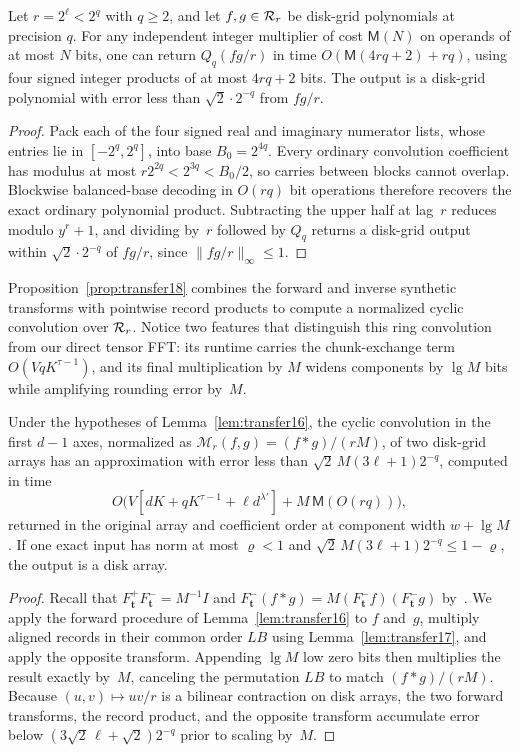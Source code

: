 \begin{lemma}\label{lem:transfer17}
Let $r=2^\ell<2^q$ with $q\ge2$, and let $f,g\in\mathcal{R}_r$ be disk-grid polynomials at precision $q$. For any independent
integer multiplier of cost $\mathsf M(N)$ on operands of at most $N$ bits, one can return $Q_q(fg/r)$ in time
$O(\mathsf M(4rq+2)+rq)$, using four signed integer products of at most $4rq+2$ bits. The output is a disk-grid
polynomial with error less than $\sqrt2\cdot2^{-q}$ from $fg/r$.
\end{lemma}

\begin{proof}
Pack each of the four signed real and imaginary numerator lists, whose entries lie in $[-2^q,2^q]$, into base $B_0=2^{4q}$. Every ordinary convolution coefficient has modulus at most $r2^{2q}<2^{3q}<B_0/2$, so carries between blocks cannot overlap. Blockwise balanced-base decoding in $O(rq)$ bit operations therefore recovers the exact ordinary polynomial product. Subtracting the upper half at lag~$r$ reduces modulo $y^r+1$, and dividing by~$r$ followed by $Q_q$ returns a disk-grid output within $\sqrt2\cdot2^{-q}$ of $fg/r$, since $\|fg/r\|_\infty\le1$.
\end{proof}

Proposition~\ref{prop:transfer18} combines the forward and inverse synthetic transforms with pointwise record products to compute a normalized cyclic convolution over $\mathcal{R}_r$. Notice two features that distinguish this ring convolution from our direct tensor FFT: its runtime carries the chunk-exchange term $O(VqK^{\tau-1})$, and its final multiplication by $M$ widens components by $\lg M$ bits while amplifying rounding error by~$M$.

\begin{proposition}\label{prop:transfer18}
Under the hypotheses of Lemma~\ref{lem:transfer16}, the cyclic convolution in the first $d-1$ axes, normalized as
$\mathcal M_r(f,g)=(f*g)/(rM)$, of two disk-grid arrays has an approximation with error less than
$\sqrt2\,M(3\ell+1)2^{-q}$, computed in time
\[
  O\bigl(V[dK+qK^{\tau-1}+\ell d^{\lambda'}]+M\,\mathsf M(O(rq))\bigr),
\]
returned in the original array and coefficient order at component width $w+\lg M$. If one exact input has norm at most
$\varrho<1$ and $\sqrt2\,M(3\ell+1)2^{-q}\le1-\varrho$, the output is a disk array.
\end{proposition}

\begin{proof}
Recall that $F^+_{\mathbf t}F^-_{\mathbf t}=M^{-1}I$ and $F^-_{\mathbf t}(f*g)=M(F^-_{\mathbf t}f)(F^-_{\mathbf t}g)$ by~\cite[Lemma~15, \S6.1]{OAI26}. We apply the forward procedure of Lemma~\ref{lem:transfer16} to $f$ and~$g$, multiply aligned records in their common order $LB$ using Lemma~\ref{lem:transfer17}, and apply the opposite transform. Appending $\lg M$ low zero bits then multiplies the result exactly by~$M$, canceling the permutation $LB$ to match $(f*g)/(rM)$. Because $(u,v)\mapsto uv/r$ is a bilinear contraction on disk arrays, the two forward transforms, the record product, and the opposite transform accumulate error below $(3\sqrt2\,\ell+\sqrt2)2^{-q}$ prior to scaling by~$M$.
\end{proof}

